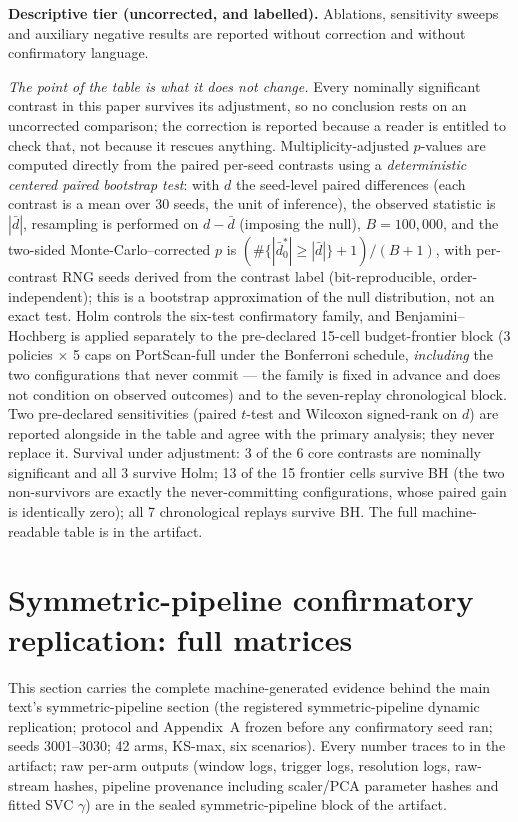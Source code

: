 \documentclass[a4paper,11pt]{article}
\begin{document}
\textbf{Descriptive tier (uncorrected, and labelled).} Ablations, sensitivity sweeps and
auxiliary negative results are reported without correction and without confirmatory language.

\emph{The point of the table is what it does not change.} Every nominally significant contrast
in this paper survives its adjustment, so no conclusion rests on an uncorrected comparison;
the correction is reported because a reader is entitled to check that, not because it rescues
anything. Multiplicity-adjusted $p$-values are computed directly from the paired per-seed
contrasts using a \emph{deterministic centered paired bootstrap test}: with $d$ the seed-level
paired differences (each contrast is a mean over 30 seeds, the unit of inference), the
observed statistic is $|\bar d|$, resampling is performed on $d - \bar d$ (imposing the null),
$B = 100{,}000$, and the two-sided Monte-Carlo--corrected $p$ is
$(\#\{|\bar d^{*}_0| \ge |\bar d|\} + 1)/(B+1)$, with per-contrast RNG seeds derived from the
contrast label (bit-reproducible, order-independent); this is a bootstrap approximation of
the null distribution, not an exact test. Holm controls the six-test confirmatory family, and
Benjamini--Hochberg is applied separately to the pre-declared 15-cell budget-frontier block
(3 policies $\times$ 5 caps on PortScan-full under the Bonferroni schedule, \emph{including}
the two configurations that never commit --- the family is fixed in advance and does not
condition on observed outcomes) and to the seven-replay chronological block. Two pre-declared
sensitivities (paired $t$-test and Wilcoxon signed-rank on $d$) are reported alongside in the
table and agree with the primary analysis; they never replace it. Survival under adjustment:
3 of the 6 core contrasts are nominally significant and all 3 survive Holm; 13 of the 15
frontier cells survive BH (the two non-survivors are exactly the never-committing
configurations, whose paired gain is identically zero); all 7 chronological replays survive
BH. The full machine-readable table is
 in the artifact.

\section{Symmetric-pipeline confirmatory replication: full matrices}
\label{sec:supp_symmetric}

This section carries the complete machine-generated evidence behind the main text's
symmetric-pipeline section (the registered symmetric-pipeline dynamic replication;
protocol and Appendix~A frozen before any confirmatory seed ran; seeds 3001--3030;
42 arms, KS-max, six scenarios). Every number traces to
 in the artifact; raw per-arm
outputs (window logs, trigger logs, resolution logs, raw-stream hashes, pipeline
provenance including scaler/PCA parameter hashes and fitted SVC $\gamma$) are in the
sealed symmetric-pipeline block of the artifact.
\end{document}
